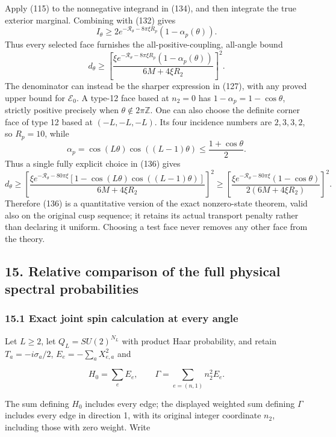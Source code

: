 \documentclass[
  11pt,
]{article}
\begin{document}
Apply (115) to the nonnegative integrand in (134), and then integrate
the true exterior marginal. Combining with (132) gives \[
 I_\theta\ge
 2e^{-\mathscr R_\theta-8\pi\xi R_p}
       (1-\alpha_p(\theta)).
 \tag{135}
\] Thus every selected face furnishes the all-positive-coupling,
all-angle bound \[
 \boxed{\quad
 d_\theta\ge
 \left[
 \frac{\xi e^{-\mathscr R_\theta-8\pi\xi R_p}
              (1-\alpha_p(\theta))}
      {6M+4\xi R_2}
 \right]^2.
 \quad}
 \tag{136}
\] The denominator can instead be the sharper expression in (127), with
any proved upper bound for \(\mathcal E_0\). A type-12 face based at
\(n_2=0\) has \(1-\alpha_p=1-\cos\theta\), strictly positive precisely
when \(\theta\notin2\pi\mathbb Z\). One can also choose the definite
corner face of type 12 based at \((-L,-L,-L)\). Its four incidence
numbers are \(2,3,3,2\), so \(R_p=10\), while \[
 \alpha_p=\cos(L\theta)\cos((L-1)\theta)
 \le\frac{1+\cos\theta}{2}.
\] Thus a single fully explicit choice in (136) gives \[
 d_\theta\ge
 \left[
 \frac{\xi e^{-\mathscr R_\theta-80\pi\xi}
       [1-\cos(L\theta)\cos((L-1)\theta)]}
      {6M+4\xi R_2}
 \right]^2
 \ge
 \left[
 \frac{\xi e^{-\mathscr R_\theta-80\pi\xi}(1-\cos\theta)}
      {2(6M+4\xi R_2)}
 \right]^2.
 \tag{137}
\] Therefore (136) is a quantitative version of the exact nonzero-state
theorem, valid also on the original cusp sequence; it retains its actual
transport penalty rather than declaring it uniform. Choosing a test face
never removes any other face from the theory.

\subsection{15. Relative comparison of the full physical spectral
probabilities}\label{relative-comparison-of-the-full-physical-spectral-probabilities}

\subsubsection{15.1 Exact joint spin calculation at every
angle}\label{exact-joint-spin-calculation-at-every-angle}

Let \(L\ge2\), let \(Q_L=SU(2)^{N_L}\) with product Haar probability,
and retain \(T_a=-i\sigma_a/2\), \(E_e=-\sum_aX_{e,a}^2\) and

\[
 H_0=\sum_eE_e,\qquad
 \Gamma=\sum_{e=(n,1)}n_2^2E_e.
\]

The sum defining \(H_0\) includes every edge; the displayed weighted sum
defining \(\Gamma\) includes every edge in direction 1, with its
original integer coordinate \(n_2\), including those with zero weight.
Write
\end{document}
